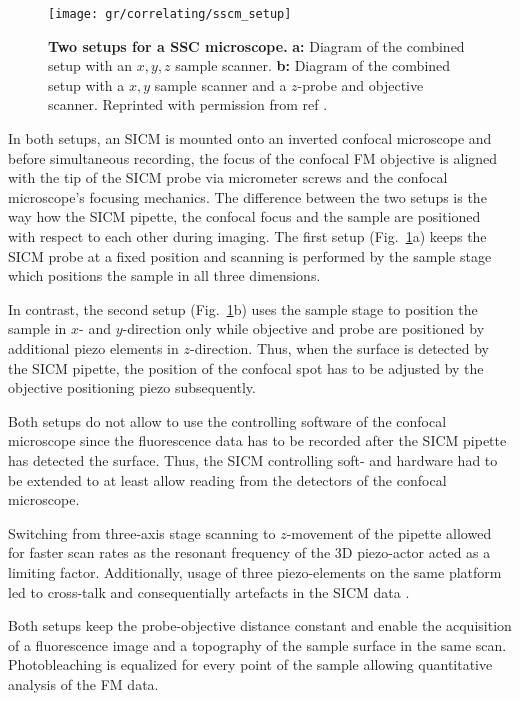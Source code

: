 \begin{figure}
  \texttt{[image: gr/correlating/sscm\_setup]}

  \caption{%
    \textbf{Two setups for a SSC microscope.}
    \textbf{a:} Diagram of the combined setup with an $x,y,z$ sample scanner.
    \textbf{b:} Diagram of the combined setup with a $x,y$ sample scanner and
    a $z$-probe and objective scanner. 
    Reprinted with permission from ref \cite{Shevchuk2013}.
  }
  \label{fig:sscm_setup}
\end{figure}

In both setups, an SICM is mounted onto an inverted confocal microscope and
before simultaneous recording, the focus of the confocal FM objective is
aligned with the tip of the SICM probe via micrometer screws and the confocal
microscope's focusing mechanics. The
difference between the two setups is the way how the SICM pipette, the
confocal focus and the sample are positioned with respect to each other during
imaging. The
first setup (Fig.~\ref{fig:sscm_setup}a) keeps the 
SICM probe at a fixed position and scanning is performed by the sample
stage which positions the sample in all three dimensions.

In contrast, the second setup (Fig.~\ref{fig:sscm_setup}b) uses the sample
stage to position the sample in $x$- and $y$-direction only while objective
and probe are positioned by additional piezo elements in $z$-direction. Thus,
when the surface is detected by the SICM pipette,  the position of
the confocal spot has to be adjusted by the objective positioning piezo subsequently.

Both setups do not allow to use the controlling software of the confocal
microscope since the fluorescence data has to be recorded after the SICM
pipette has detected the surface. Thus, the SICM controlling soft- and
hardware had to be extended to at least allow reading from the detectors of
the confocal microscope. 

Switching from three-axis stage scanning to $z$-movement of the pipette
allowed for faster scan rates as the resonant frequency of the 3D
piezo-actor acted as a limiting factor. Additionally, usage of three
piezo-elements on the same platform led to cross-talk and consequentially
artefacts in the SICM data \cite{Shevchuk2013}.



Both setups keep the probe-objective distance constant and enable the
acquisition of a fluorescence image and a topography of the sample surface in
the same scan. Photobleaching is equalized for every point of the sample
allowing quantitative analysis of the FM data.

